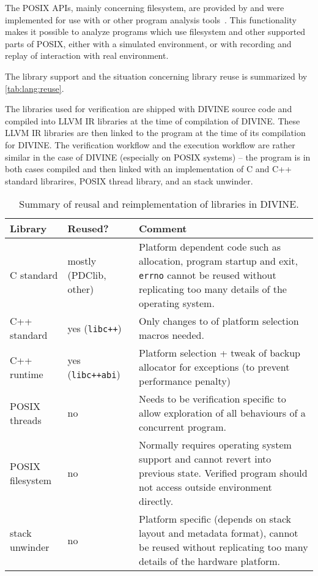 The POSIX APIs, mainly concerning filesystem, are provided by \dios and were
implemented for use with \divine or other program analysis
tools~.
This functionality makes it possible to analyze programs which use filesystem and other supported parts of POSIX, either with a simulated environment, or with recording and replay of interaction with real environment.

The library support and the situation concerning library reuse is summarized by \autoref{tab:lang:reuse}.

The libraries used for verification are shipped with DIVINE source code and
compiled into LLVM IR libraries at the time of compilation of DIVINE.
These LLVM IR libraries are then linked to the program at the time of its
compilation for DIVINE.
The verification workflow and the execution workflow are rather similar in the
case of DIVINE (especially on POSIX systems) -- the program is in both cases
compiled and then linked with an implementation of C and C++ standard
librarires, POSIX thread library, and an stack unwinder.

\begin{table}[tp]
  \begin{tabularx}{\textwidth}{>{\raggedright}p{5.5em}p{5.5em}L}
      \toprule
      Library    & Reused? & Comment \\\midrule\midrule
      C standard & mostly (\mbox{PDClib}, other) & Platform dependent code such as allocation, program startup and exit, \texttt{errno} cannot be reused without replicating too many details of the operating system. \\\midrule
      C++ standard & yes (\texttt{libc++}) & Only changes to of platform selection macros needed. \\\midrule
      C++ runtime  & yes (\texttt{libc++abi}) & Platform selection + tweak of backup allocator for exceptions (to prevent performance penalty) \\\midrule
      POSIX threads & no & Needs to be verification specific to allow exploration of all behaviours of a concurrent program. \\\midrule
      POSIX filesystem & no & Normally requires operating system support and cannot revert into previous state. Verified program should not access outside environment directly. \\\midrule
      stack unwinder & no & Platform specific (depends on stack layout and metadata format), cannot be reused without replicating too many details of the hardware platform. \\
      \bottomrule
  \end{tabularx}
  \caption{Summary of reusal and reimplementation of libraries in DIVINE.}\label{tab:lang:reuse}
\end{table}

